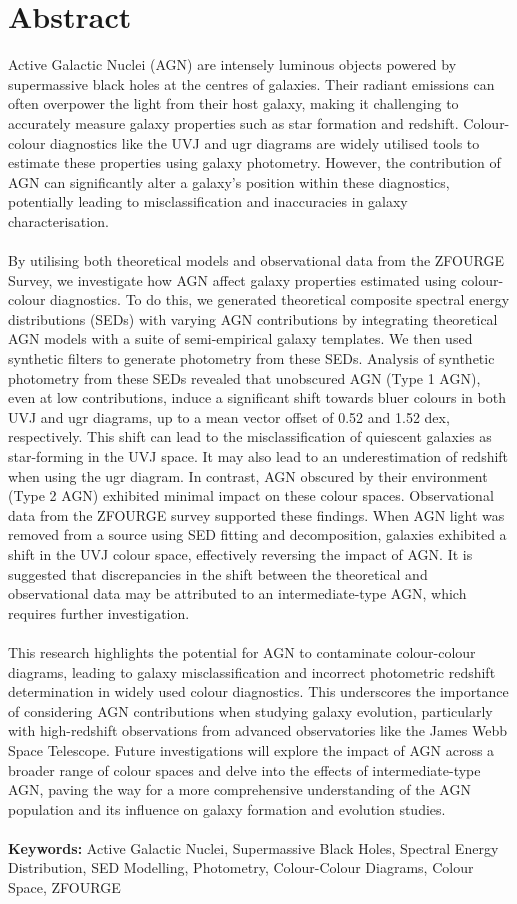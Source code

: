 \chapter*{Abstract}
\thispagestyle{empty}
Active Galactic Nuclei (AGN) are intensely luminous objects powered by supermassive black holes at the centres of galaxies. Their radiant emissions can often overpower the light from their host galaxy, making it challenging to accurately measure galaxy properties such as star formation and redshift. Colour-colour diagnostics like the UVJ and ugr diagrams are widely utilised tools to estimate these properties using galaxy photometry. However, the contribution of AGN can significantly alter a galaxy's position within these diagnostics, potentially leading to misclassification and inaccuracies in galaxy characterisation.\\\\By utilising both theoretical models and observational data from the ZFOURGE Survey, we investigate how AGN affect galaxy properties estimated using colour-colour diagnostics. To do this, we generated theoretical composite spectral energy distributions (SEDs) with varying AGN contributions by integrating theoretical AGN models with a suite of semi-empirical galaxy templates. We then used synthetic filters to generate photometry from these SEDs. Analysis of synthetic photometry from these SEDs revealed that unobscured AGN (Type 1 AGN), even at low contributions, induce a significant shift towards bluer colours in both UVJ and ugr diagrams, up to a mean vector offset of 0.52 and 1.52 dex, respectively. This shift can lead to the misclassification of quiescent galaxies as star-forming in the UVJ space. It may also lead to an underestimation of redshift when using the ugr diagram.
In contrast, AGN obscured by their environment (Type 2 AGN) exhibited minimal impact on these colour spaces. Observational data from the ZFOURGE survey supported these findings. When AGN light was removed from a source using SED fitting and decomposition, galaxies exhibited a shift in the UVJ colour space, effectively reversing the impact of AGN. It is suggested that discrepancies in the shift between the theoretical and observational data may be attributed to an intermediate-type AGN, which requires further investigation.\\\\ 
This research highlights the potential for AGN to contaminate colour-colour diagrams, leading to galaxy misclassification and incorrect photometric redshift determination in widely used colour diagnostics. This underscores the importance of considering AGN contributions when studying galaxy evolution, particularly with high-redshift observations from advanced observatories like the James Webb Space Telescope. Future investigations will explore the impact of AGN across a broader range of colour spaces and delve into the effects of intermediate-type AGN, paving the way for a more comprehensive understanding of the AGN population and its influence on galaxy formation and evolution studies. \\\\ \noindent \noindent \textbf{Keywords:} Active Galactic Nuclei, Supermassive Black Holes, Spectral Energy Distribution, SED Modelling, Photometry, Colour-Colour Diagrams, Colour Space, ZFOURGE
